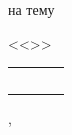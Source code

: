 \begin{center}
\begin{center}


{\smaller[1]
на тему

<<\Title>>}
\end{center}

\vfill

\large

\begin{tabular}{p{}P{0.25\textwidth}P{0.01\textwidth}P{0.25\textwidth}} 
 \\[10pt]
 \\[10pt]
 \\[10pt]
\end{tabular}

\vfill

\City, \Year

\end{center}




